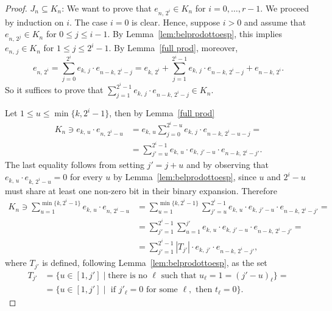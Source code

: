 \documentclass[11pt]{article}
\newcommand{\es}[2]{e_{#1,\, #2}}
\theoremstyle{plain}
\theoremstyle{definition}
\theoremstyle{remark}
\begin{document}
\begin{proof}
    $J_n\subseteq K_n$: We want to prove that $\es{n}{2^i}\in K_n$ for $i=0,\dots,r-1$. We proceed by induction on $i$. The case $i=0$ is clear. Hence, suppose $i>0$ and assume that $\es{n}{2^j}\in K_n$ for $0\leq j\leq i-1$. By Lemma~\ref{lem:belprodottoesp}, this implies $\es{n}{j}\in K_n$ for $1\leq j\leq 2^i-1$. By Lemma~\ref{full prod}, moreover,
    \begin{equation*}
        \es{n}{2^i}=\sum\limits_{j=0}^{2^i}\es{k}{j}\cdot\es{n-k}{2^i-j}=\es{k}{2^i}+\sum\limits_{j=1}^{2^i-1}\es{k}{j}\cdot\es{n-k}{2^i-j}+\es{n-k}{2^i}.
    \end{equation*}
    So it suffices to prove that $\sum\limits_{j=1}^{2^i-1}\es{k}{j}\cdot\es{n-k}{2^i-j}\in K_n$.

    Let $1\leq u\leq\min\{k,2^i-1\}$, then by Lemma~\ref{full prod}
    \begin{align*}
        K_n\ni\es{k}{u}\cdot\es{n}{2^i-u}&=\es{k}{u}\sum\limits_{j=0}^{2^i-u}\es{k}{j}\cdot\es{n-k}{2^i-u-j}=\\
        &=\sum\limits_{j'=u}^{2^i-1}\es{k}{u}\cdot\es{k}{j'-u}\cdot\es{n-k}{2^i-j'}.
    \end{align*}
    The last equality follows from setting $j'=j+u$ and by observing that $\es{k}{u}\cdot\es{k}{2^i-u}=0$ for every $u$ by Lemma~\ref{lem:belprodottoesp}, since $u$ and $2^i-u$ must share at least one non-zero bit in their binary expansion. 
    Therefore
    \begin{align*}
        K_n\ni\sum\limits_{u=1}^{\min\{k,2^i-1\}}\es{k}{u}\cdot\es{n}{2^i-u}
        &=\sum\limits_{u=1}^{\min\{k,2^i-1\}}\sum\limits_{j'=u}^{2^i-1}\es{k}{u}\cdot\es{k}{j'-u}\cdot\es{n-k}{2^i-j'}=\\
        &=\sum\limits_{j'=1}^{2^i-1}\sum\limits_{u=1}^{j'}\es{k}{u}\cdot\es{k}{j'-u}\cdot\es{n-k}{2^i-j'}=\\
        &=\sum\limits_{j'=1}^{2^i-1}|T_{j'}|\cdot\es{k}{j'}\cdot\es{n-k}{2^i-j'},
    \end{align*}
    where $T_{j'}$ is defined, following Lemma~\ref{lem:belprodottoesp}, as the set
    \begin{align*}
        T_{j'} &=\{u\in[1,j']\mid \text{there is no $\ell$ such that $u_\ell=1=(j'-u)_\ell$}\}=\\
        &=\{u\in[1,j']\mid \text{ if } j'_\ell =0 \text{ for some }\ell, \text{ then } t_\ell=0\}.

\end{align*}
\end{proof}
\end{document}
